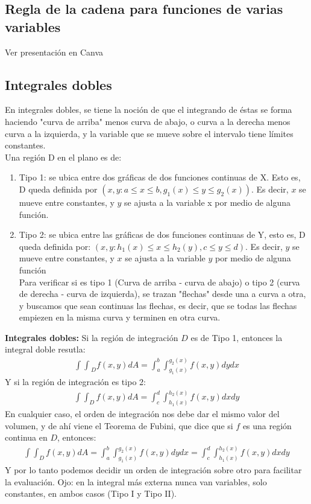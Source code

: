 \documentclass[12pt, letterpaper]{report}
\begin{document}
\subsection*{Regla de la cadena para funciones de varias variables}
Ver presentación en Canva 
\subsection*{Integrales dobles}
En integrales dobles, se tiene la noción de que el integrando de éstas se forma haciendo "curva de arriba" menos curva de abajo, o curva a la derecha menos curva 
a la izquierda, y la variable que se mueve sobre el intervalo tiene límites constantes. \\
Una región D en el plano es de: 
\begin{enumerate}
\item Tipo 1: se ubica entre dos gráficas de dos funciones continuas de X. Esto es, D queda definida por 
$(x, y :  a \leq x \leq b, g_1(x) \leq y \leq g_2(x))$. Es decir, $x$ se mueve entre constantes, y $y$ se ajusta a la variable 
x por medio de alguna función. 
\item Tipo 2: se ubica entre las gráficas de dos funciones continuas de Y, esto es, D queda definida por: 
$(x, y : h_1(x) \leq x \leq h_2(y), c \leq y \leq d)$. Es decir, $y$ se mueve entre constantes, y $x$ se ajusta a la variable $y$ por medio 
de alguna función \\ 

Para verificar si es tipo 1 (Curva de arriba - curva de abajo) o tipo 2 (curva de derecha - curva de izquierda), se trazan "flechas"
desde una a curva a otra, y buscamos que sean continuas las flechas, es decir, que se todas las flechas empiezen en la misma curva y terminen 
en otra curva. 
\end{enumerate}
\textbf{Integrales dobles: } Si la región de integración $D$ es de Tipo 1, entonces la integral doble resutla: 
\begin{align}
{\int\int}_D f(x, y) dA = \int_{a}^{b} \int_{g_1(x)}^{g_2(x)} f(x, y) dydx
\end{align}
Y si la región de integración es tipo 2: 
\begin{align}
    \int \int_Df(x, y) dA = \int_{c}^{d} \int_{h_1(x)}^{h_2(x)} f(x, y) dxdy
\end{align}
En cualquier caso, el orden de integración nos debe dar el mismo valor del volumen, y de ahí viene el Teorema de Fubini, 
que dice que si $f$ es una región continua en $D$, entonces: 
\begin{align}
    \int \int_Df(x, y) dA = \int_{a}^{b} \int_{g_1(x)}^{g_2(x)} f(x, y) dydx = \int_{c}^{d} \int_{h_1(x)}^{h_2(x)} f(x, y) dxdy
\end{align}
Y por lo tanto podemos decidir un orden de integración sobre otro para facilitar la evaluación. Ojo: en la integral más externa 
nunca van variables, solo constantes, en ambos casos (Tipo I y Tipo II). 
\end{document}
